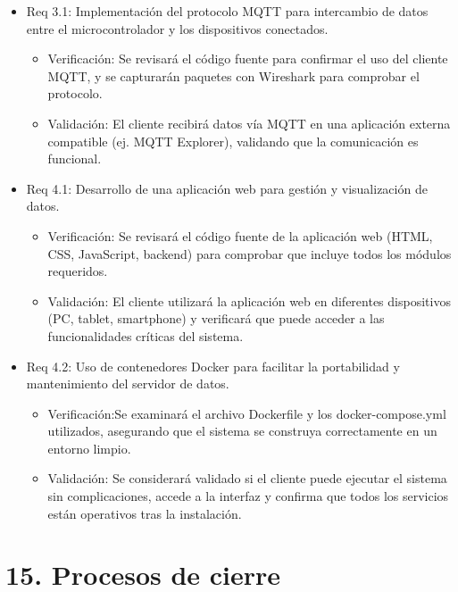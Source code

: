\documentclass[
11pt, %
]{charter}
\begin{document}
\begin{itemize}
\item Req 3.1: Implementación del protocolo MQTT para intercambio de datos entre el microcontrolador y los dispositivos conectados.

\begin{itemize}
	\item Verificación: Se revisará el código fuente para confirmar el uso del cliente MQTT, y se capturarán paquetes con Wireshark para comprobar el protocolo.
	
	\item Validación: El cliente recibirá datos vía MQTT en una aplicación externa compatible (ej. MQTT Explorer), validando que la comunicación es funcional.
\end{itemize}

\item Req 4.1: Desarrollo de una aplicación web para gestión y visualización de datos.
\begin{itemize}
	\item Verificación: Se revisará el código fuente de la aplicación web (HTML, CSS, JavaScript, backend) para comprobar que incluye todos los módulos requeridos.
	
	\item Validación: El cliente utilizará la aplicación web en diferentes dispositivos (PC, tablet, smartphone) y verificará que puede acceder a las funcionalidades críticas del sistema.
	\end{itemize}
	
\item Req 4.2: Uso de contenedores Docker para facilitar la portabilidad y mantenimiento del servidor de datos.
\begin{itemize}
	\item Verificación:Se examinará el archivo Dockerfile y los docker-compose.yml utilizados, asegurando que el sistema se construya correctamente en un entorno limpio. 

	\item Validación: Se considerará validado si el cliente puede ejecutar el sistema sin complicaciones, accede a la interfaz y confirma que todos los servicios están operativos tras la instalación.
\end{itemize}

\end{itemize}

\section{15. Procesos de cierre}    
\label{sec:cierre}
\end{document}
